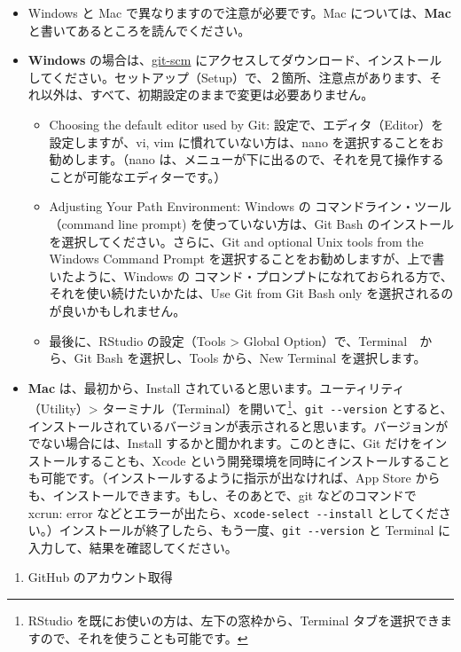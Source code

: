 \documentclass[
]{bxjsbook}
\providecommand{\tightlist}{%
  \setlength{\itemsep}{0pt}\setlength{\parskip}{0pt}}
\theoremstyle{definition}
\theoremstyle{definition}
\theoremstyle{definition}
\theoremstyle{definition}
\theoremstyle{remark}
\begin{document}
\begin{itemize}
\tightlist
\item
  Windows と Mac で異なりますので注意が必要です。Mac については、\textbf{Mac} と書いてあるところを読んでください。
\item
  \textbf{Windows} の場合は、\href{https://git-scm.com/download/win}{git-scm} にアクセスしてダウンロード、インストールしてください。セットアップ（Setup）で、２箇所、注意点があります、それ以外は、すべて、初期設定のままで変更は必要ありません。

  \begin{itemize}
  \tightlist
  \item
    Choosing the default editor used by Git: 設定で、エディタ（Editor）を設定しますが、vi, vim に慣れていない方は、nano を選択することをお勧めします。（nano は、メニューが下に出るので、それを見て操作することが可能なエディターです。）
  \item
    Adjusting Your Path Environment: Windows の コマンドライン・ツール（command line prompt) を使っていない方は、Git Bash のインストールを選択してください。さらに、Git and optional Unix tools from the Windows Command Prompt を選択することをお勧めしますが、上で書いたように、Windows の コマンド・プロンプトになれておられる方で、それを使い続けたいかたは、Use Git from Git Bash only を選択されるのが良いかもしれません。
  \item
    最後に、RStudio の設定（Tools \textgreater{} Global Option）で、Terminal　から、Git Bash を選択し、Tools から、New Terminal を選択します。
  \end{itemize}
\item
  \textbf{Mac} は、最初から、Install されていると思います。ユーティリティ（Utility）\textgreater{} ターミナル（Terminal）を開いて\footnote{RStudio を既にお使いの方は、左下の窓枠から、Terminal タブを選択できますので、それを使うことも可能です。}、\texttt{git\ -\/-version} とすると、インストールされているバージョンが表示されると思います。バージョンがでない場合には、Install するかと聞かれます。このときに、Git だけをインストールすることも、Xcode という開発環境を同時にインストールすることも可能です。（インストールするように指示が出なければ、App Store からも、インストールできます。もし、そのあとで、git などのコマンドで xcrun: error などとエラーが出たら、\texttt{xcode-select\ -\/-install} としてください。）インストールが終了したら、もう一度、\texttt{git\ -\/-version} と Terminal に入力して、結果を確認してください。
\end{itemize}

\begin{enumerate}
\def\labelenumi{\arabic{enumi}.}
\setcounter{enumi}{1}
\tightlist
\item
  GitHub のアカウント取得
\end{enumerate}
\end{document}
